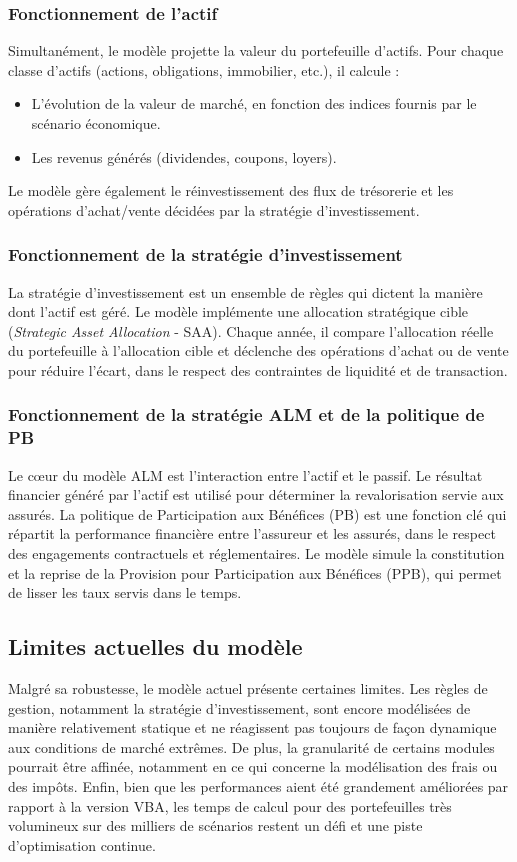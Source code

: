 \subsubsection{Fonctionnement de l'actif}
Simultanément, le modèle projette la valeur du portefeuille d'actifs. Pour chaque classe d'actifs (actions, obligations, immobilier, etc.), il calcule :
\begin{itemize}
    \item L'évolution de la valeur de marché, en fonction des indices fournis par le scénario économique.
    \item Les revenus générés (dividendes, coupons, loyers).
\end{itemize}
Le modèle gère également le réinvestissement des flux de trésorerie et les opérations d'achat/vente décidées par la stratégie d'investissement.

\subsubsection{Fonctionnement de la stratégie d'investissement}
La stratégie d'investissement est un ensemble de règles qui dictent la manière dont l'actif est géré. Le modèle implémente une allocation stratégique cible (\textit{Strategic Asset Allocation} - SAA). Chaque année, il compare l'allocation réelle du portefeuille à l'allocation cible et déclenche des opérations d'achat ou de vente pour réduire l'écart, dans le respect des contraintes de liquidité et de transaction.

\subsubsection{Fonctionnement de la stratégie ALM et de la politique de PB}
Le cœur du modèle ALM est l'interaction entre l'actif et le passif. Le résultat financier généré par l'actif est utilisé pour déterminer la revalorisation servie aux assurés. La politique de Participation aux Bénéfices (PB) est une fonction clé qui répartit la performance financière entre l'assureur et les assurés, dans le respect des engagements contractuels et réglementaires. Le modèle simule la constitution et la reprise de la Provision pour Participation aux Bénéfices (PPB), qui permet de lisser les taux servis dans le temps.

\subsection{Limites actuelles du modèle}
Malgré sa robustesse, le modèle actuel présente certaines limites. Les règles de gestion, notamment la stratégie d'investissement, sont encore modélisées de manière relativement statique et ne réagissent pas toujours de façon dynamique aux conditions de marché extrêmes. De plus, la granularité de certains modules pourrait être affinée, notamment en ce qui concerne la modélisation des frais ou des impôts. Enfin, bien que les performances aient été grandement améliorées par rapport à la version VBA, les temps de calcul pour des portefeuilles très volumineux sur des milliers de scénarios restent un défi et une piste d'optimisation continue.

